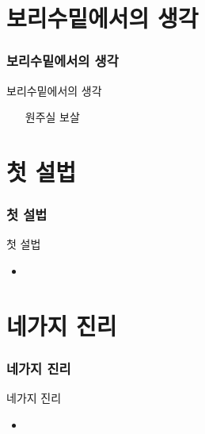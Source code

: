 \documentclass[aspectratio=1610,17pt,xcolor=pdftex,dvipsnames,table,handout]{beamer}
\begin{document}
		\section{ 보리수밑에서의 생각	}	
		\begin{frame} [t,plain]
		\frametitle{		보리수밑에서의 생각	}	
			\begin{block} { 		보리수밑에서의 생각	}
			\setlength{\leftmargini}{6em}			
			\begin{itemize}
				\item [원주실 보살] 
			\end{itemize}
			\end{block}						
								
		\end{frame}						

		\section{ 첫 설법	}	
		\begin{frame} [t,plain]
		\frametitle{		첫 설법	}	
			\begin{block} { 		첫 설법	}
			\setlength{\leftmargini}{6em}			
			\begin{itemize}
				\item 
			\end{itemize}
			\end{block}						
								
		\end{frame}						

		\section{ 네가지 진리	}	
		\begin{frame} [t,plain]
		\frametitle{		네가지 진리	}	
			\begin{block} { 		네가지 진리	}
			\setlength{\leftmargini}{6em}			
			\begin{itemize}
				\item 
			\end{itemize}
			\end{block}						
								
		\end{frame}						
\end{document}
